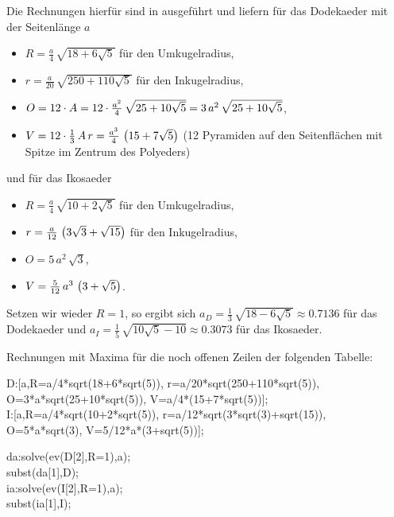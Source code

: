 \documentclass[11pt]{article}
\begin{document}
Die Rechnungen hierfür sind in \cite{Fendt1, Fendt2} ausgeführt und liefern
für das Dodekaeder mit der Seitenlänge $a$
\begin{itemize}
\item $R=\frac{a}{4}\,\sqrt{18+6\sqrt{5}}$ für den Umkugelradius,
\item $r=\frac{a}{20}\,\sqrt{250+110\sqrt{5}}$ für den Inkugelradius,
\item $O=12\cdot A=12\cdot\frac{a^2}{4}\,\sqrt{25+10\sqrt{5}}
  =3\,a^2\,\sqrt{25+10\sqrt{5}}$,
\item $V=12\cdot\frac13\,A\,r =\frac{a^3}{4}\,\left(15+7\sqrt{5}\right)$ (12 Pyramiden
  auf den Seitenflächen mit Spitze im Zentrum des Polyeders)
\end{itemize}
und für das Ikosaeder
\begin{itemize}
\item $R=\frac{a}{4}\,\sqrt{10+2\sqrt{5}}$ für den Umkugelradius,
\item $r=\frac{a}{12}\,\left(3\sqrt{3}+\sqrt{15}\right)$ für den Inkugelradius,
\item $O=5\,a^2\,\sqrt{3}$,
\item $V=\frac{5}{12}\,a^3\,\left(3+\sqrt{5}\right)$.
\end{itemize}
Setzen wir wieder $R=1$, so ergibt sich $a_D=\frac13\,\sqrt{18-6\sqrt{5}}
\approx 0.7136$ für das Dodekaeder und $a_I=\frac15\,\sqrt{10\sqrt{5}-10}
\approx 0.3073$ für das Ikosaeder. 

Rechnungen mit Maxima für die noch offenen Zeilen der folgenden Tabelle:
\begin{code}
  D:[a,R=a/4*sqrt(18+6*sqrt(5)), r=a/20*sqrt(250+110*sqrt(5)),\\\>
    O=3*a*sqrt(25+10*sqrt(5)), V=a/4*(15+7*sqrt(5))];\\[4pt]

  I:[a,R=a/4*sqrt(10+2*sqrt(5)), r=a/12*sqrt(3*sqrt(3)+sqrt(15)),\\\>
    O=5*a*sqrt(3), V=5/12*a*(3+sqrt(5))];

  da:solve(ev(D[2],R=1),a);\\
  subst(da[1],D);\\[4pt]

  ia:solve(ev(I[2],R=1),a);\\
  subst(ia[1],I);\\[4pt]
\end{code}
\end{document}
